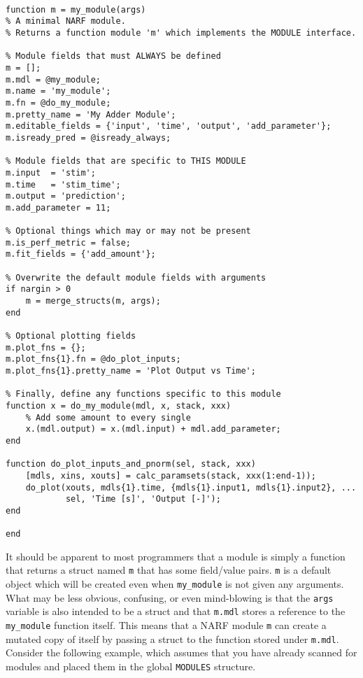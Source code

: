 \documentclass[letterpaper]{report}
\newcommand{\matlab}[1]{\texttt{#1}}
\begin{document}
\begin{verbatim}

function m = my_module(args)
% A minimal NARF module. 
% Returns a function module 'm' which implements the MODULE interface.

% Module fields that must ALWAYS be defined
m = [];
m.mdl = @my_module;
m.name = 'my_module';
m.fn = @do_my_module;
m.pretty_name = 'My Adder Module';
m.editable_fields = {'input', 'time', 'output', 'add_parameter'};
m.isready_pred = @isready_always;

% Module fields that are specific to THIS MODULE
m.input  = 'stim';
m.time   = 'stim_time';
m.output = 'prediction';
m.add_parameter = 11;

% Optional things which may or may not be present
m.is_perf_metric = false;
m.fit_fields = {'add_amount'};

% Overwrite the default module fields with arguments 
if nargin > 0
    m = merge_structs(m, args);
end

% Optional plotting fields
m.plot_fns = {};
m.plot_fns{1}.fn = @do_plot_inputs;
m.plot_fns{1}.pretty_name = 'Plot Output vs Time';

% Finally, define any functions specific to this module
function x = do_my_module(mdl, x, stack, xxx)   
    % Add some amount to every single 
    x.(mdl.output) = x.(mdl.input) + mdl.add_parameter;
end

function do_plot_inputs_and_pnorm(sel, stack, xxx)
    [mdls, xins, xouts] = calc_paramsets(stack, xxx(1:end-1)); 
    do_plot(xouts, mdls{1}.time, {mdls{1}.input1, mdls{1}.input2}, ...
            sel, 'Time [s]', 'Output [-]');
end

end
\end{verbatim}

It should be apparent to most programmers that a module is simply a function that returns a struct named \matlab{m} that has some field/value pairs. \matlab{m} is a default object which will be created even when \matlab{my\_module} is not given any arguments. What may be less obvious, confusing, or even mind-blowing is that the \matlab{args} variable is also intended to be a struct and that \matlab{m.mdl} stores a reference to the \matlab{my\_module} function itself. This means that a NARF module \matlab{m} can create a mutated copy of itself by passing a struct to the function stored under \matlab{m.mdl}. Consider the following example, which assumes that you have already scanned for modules and placed them in the global \matlab{MODULES} structure.
\end{document}
